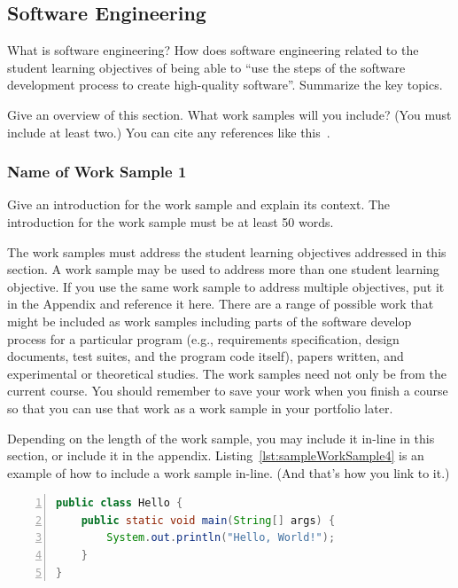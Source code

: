 \subsection{Software Engineering}\label{chap:softwareEngineering}
What is software engineering?  How does software engineering related to the
student learning objectives of being able to ``use the steps of the software
development process to create high-quality software''.  Summarize the key
topics.

Give an overview of this section.  What work samples will you include?
(You must include at least two.)  You can cite any references like
this~\cite{parks:samsfsoal:2009}.

\subsubsection{Name of Work Sample 1}
Give an introduction for the work sample and explain its context.  The
introduction for the work sample must be at least 50 words.

The work samples must address the student learning objectives addressed in
this section.  A work sample may be used to address more than one student
learning objective.  If you use the same work sample to address multiple
objectives, put it in the Appendix and reference it here.
There are a range of possible work that might be
included as work samples including parts of the software develop process
for a particular program (e.g., requirements specification, design documents,
test suites, and the program code itself), papers written, and
experimental or theoretical studies.  The work samples need not only
be from the current course.  You should remember to save your work when
you finish a course so that you can use that work as a work sample in
your portfolio later.

Depending on the length of the work sample, you may include it in-line in
this section, or include it in the appendix.  Listing~\ref{lst:sampleWorkSample4}
is an example of how to include a work sample in-line. (And that's how you
link to it.)

\begin{singlespace}
\begin{lstlisting}[float,
                   escapeinside='',
                   basicstyle=\ttfamily\footnotesize,
                   emphstyle=\textbf,
                   numberstyle=\tiny,
                   xleftmargin=.3cm,
                   language=java,
                   numbers=left,
                   numbersep=5pt,
                   firstnumber=auto,
                   stepnumber=1,
                   numberblanklines=true,
                   showspaces=false,
                   showstringspaces=false,
                   showtabs=false,
                   captionpos=b,
                   caption=Sample Java Source File,
                   label=lst:sampleWorkSample4]
public class Hello {
    public static void main(String[] args) {
        System.out.println("Hello, World!");
    }
}
\end{lstlisting}
\end{singlespace}


